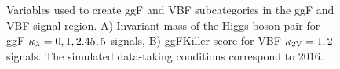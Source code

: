 \begin{figure}[ht!]
\captionsetup[subfigure]{justification=centering}
\centering
\begin{center}
\end{center}
\caption[Variables used to create ggF and VBF subcategories in the ggF and VBF signal region]{Variables used to create ggF and VBF subcategories in the ggF and VBF signal region. A) Invariant mass of the Higgs boson pair for ggF $\kappa_{\lambda}=0,1,2.45,5$ signals, B) ggFKiller score for VBF $\mathrm{\kappa_{2V} }=1,2$ signals. The simulated data-taking conditions correspond to 2016.}
\label{event_selection:fig:obssubcategory}
\end{figure}

